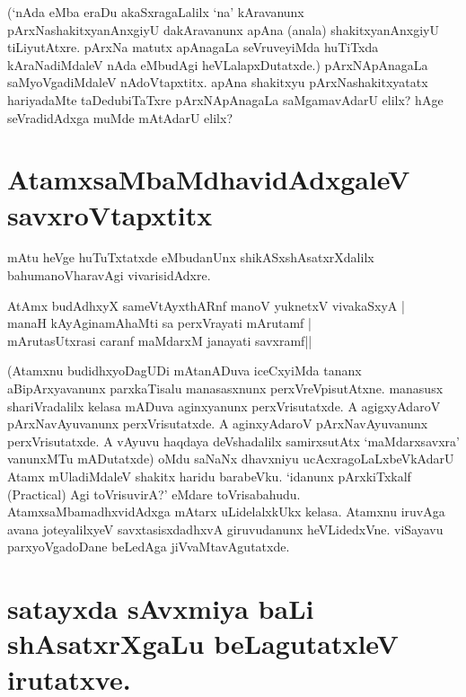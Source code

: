 (`nAda eMba eraDu akaSxragaLalilx  `na' kAravanunx  pArxNashakitxyanAnxgiyU dakAravanunx apAna (anala) shakitxyanAnxgiyU tiLiyutAtxre. pArxNa matutx apAnagaLa seVruveyiMda huTiTxda kAraNadiMdaleV nAda eMbudAgi heVLalapxDutatxde.) pArxNApAnagaLa saMyoVgadiMdaleV nAdoVtapxtitx. apAna shakitxyu pArxNashakitxyatatx hariyadaMte taDedubiTaTxre pArxNApAnagaLa saMgamavAdarU elilx? hAge seVradidAdxga muMde mAtAdarU elilx?

\section*{AtamxsaMbaMdhavidAdxgaleV savxroVtapxtitx}

mAtu heVge huTuTxtatxde eMbudanUnx  shikASxshAsatxrXdalilx bahumanoVharavAgi vivarisidAdxre.

\begin{shloka}
AtAmx budAdhxyX sameVtAyxthARnf manoV yuknetxV vivakaSxyA |\label{18}\\
manaH kAyAginamAhaMti sa perxVrayati mArutamf |\\
mArutasUtxrasi caranf maMdarxM janayati savxramf||
\end{shloka}

(Atamxnu budidhxyoDagUDi mAtanADuva iceCxyiMda tananx aBipArxyavanunx parxkaTisalu manasasxnunx  perxVreVpisutAtxne. manasusx shariVradalilx kelasa mADuva aginxyanunx perxVrisutatxde.  A agigxyAdaroV pArxNavAyuvanunx perxVrisutatxde. A aginxyAdaroV pArxNavAyuvanunx perxVrisutatxde. A vAyuvu haqdaya deVshadalilx samirxsutAtx `maMdarxsavxra' vanunxMTu mADutatxde) oMdu saNaNx dhavxniyu ucAcxragoLaLxbeVkAdarU Atamx mUladiMdaleV shakitx haridu barabeVku. `idanunx pArxkiTxkalf {(\eng Practical)} Agi toVrisuvirA?' eMdare toVrisabahudu. AtamxsaMbamadhxvidAdxga mAtarx uLidelalxkUkx kelasa. Atamxnu iruvAga avana joteyalilxyeV savxtasisxdadhxvA giruvudanunx  heVLidedxVne. viSayavu parxyoVgadoDane beLedAga jiVvaMtavAgutatxde.

\section*{satayxda sAvxmiya baLi shAsatxrXgaLu beLagutatxleV irutatxve.}

